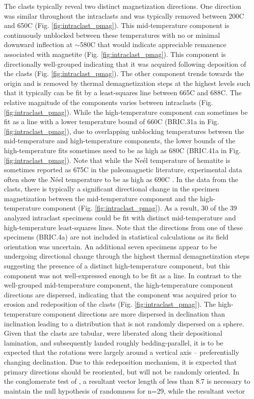 \documentclass[draft]{agujournal2018}
\begin{document}
The clasts typically reveal two distinct magnetization directions. One direction was similar throughout the intraclasts and was typically removed between 200\textdegree C and 650\textdegree C (Fig. \ref{fig:intraclast_pmag}). This mid-temperature component is continuously unblocked between these temperatures with no or minimal downward inflection at $\sim$580\textdegree C that would indicate appreciable remanence associated with magnetite (Fig. \ref{fig:intraclast_pmag}). This component is directionally well-grouped indicating that it was acquired following deposition of the clasts (Fig. \ref{fig:intraclast_pmag}). The other component trends towards the origin and is removed by thermal demagnetization steps at the highest levels such that it typically can be fit by a least-squares line between 665\textdegree C and 688\textdegree C. The relative magnitude of the components varies between intraclasts (Fig. \ref{fig:intraclast_pmag}). While the high-temperature component can sometimes be fit as a line with a lower temperature bound of 660\textdegree C (BRIC.31a in Fig. \ref{fig:intraclast_pmag}), due to overlapping unblocking temperatures between the mid-temperature and high-temperature components, the lower bounds of the high-temperature fits sometimes need to be as high as 680\textdegree C (BRIC.41a in Fig. \ref{fig:intraclast_pmag}). Note that while the Ne\'el temperature of hematite is sometimes reported as 675\textdegree C in the paleomagnetic literature, experimental data often show the N\'eel temperature to be as high as 690\textdegree C \citep{Ozdemir2006a}. In the data from the clasts, there is typically a significant directional change in the specimen magnetization between the mid-temperature component and the high-temperature component (Fig. \ref{fig:intraclast_pmag}). As a result, 30 of the 39 analyzed intraclast specimens could be fit with distinct mid-temperature and high-temperature least-squares lines. Note that the directions from one of these specimens (BRIC.4a) are not included in statistical calculations as its field orientation was uncertain. An additional seven specimens appear to be undergoing directional change through the highest thermal demagnetization steps suggesting the presence of a distinct high-temperature component, but this component was not well-expressed enough to be fit as a line. In contrast to the well-grouped mid-temperature component, the high-temperature component directions are dispersed, indicating that the component was acquired prior to erosion and redeposition of the clasts (Fig. \ref{fig:intraclast_pmag}). The high-temperature component directions are more dispersed in declination than inclination leading to a distribution that is not randomly dispersed on a sphere. Given that the clasts are tabular, were liberated along their depositional lamination, and subsequently landed roughly bedding-parallel, it is to be expected that the rotations were largely around a vertical axis -- preferentially changing declination. Due to this redeposition mechanism, it is expected that primary directions should be reoriented, but will not be randomly oriented. In the conglomerate test of \cite{Watson1956a}, a resultant vector length of less than 8.7 is necessary to maintain the null hypothesis of randomness for n=29, while the resultant vector 
\end{document}
